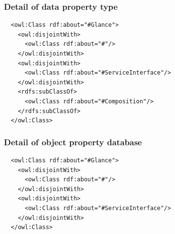 \subsubsection{Detail of data property type}

\begin{lstlisting}
  <owl:Class rdf:about="#Glance">
    <owl:disjointWith>
      <owl:Class rdf:about="#"/>
    </owl:disjointWith>
    <owl:disjointWith>
      <owl:Class rdf:about="#ServiceInterface"/>
    </owl:disjointWith>
    <rdfs:subClassOf>
      <owl:Class rdf:about="#Composition"/>
    </rdfs:subClassOf>
  </owl:Class>
\end{lstlisting}

\subsubsection{Detail of object property database}

\begin{lstlisting}
  <owl:Class rdf:about="#Glance">
    <owl:disjointWith>
      <owl:Class rdf:about="#"/>
    </owl:disjointWith>
    <owl:disjointWith>
      <owl:Class rdf:about="#ServiceInterface"/>
    </owl:disjointWith>
  </owl:Class>
\end{lstlisting}
